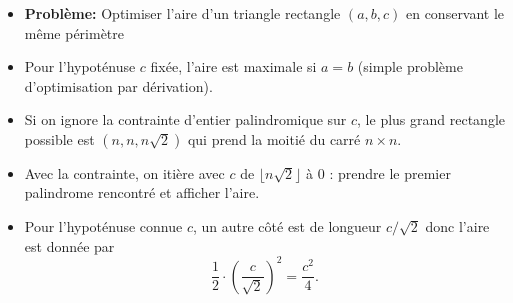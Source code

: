 \begin{frame}
    \frametitle{\problemtitle}
    \begin{itemize}
        \item<+-> \textbf{Problème:} Optimiser l'aire d'un triangle rectangle $(a,b,c)$ en conservant le même périmètre
        \item<+-> Pour l'hypoténuse $c$ fixée, l'aire est maximale si $a=b$ (simple problème d'optimisation par dérivation).
        \item<+-> Si on ignore la contrainte d'entier palindromique sur $c$, le plus grand rectangle possible est $(n,n,n\sqrt{2})$ qui prend la moitié du carré $n\times n$.
        \item<+-> Avec la contrainte, on itière avec $c$ de $\lfloor n\sqrt{2} \rfloor$ à $0$ : prendre le premier palindrome rencontré et afficher l'aire.
        \item<+-> Pour l'hypoténuse connue $c$, un autre côté est de longueur $c/\sqrt{2}$ donc l'aire est donnée par \[\frac{1}{2}\cdot\left(\frac{c}{\sqrt{2}}\right)^2 = \frac{c^2}{4}.\]

    \end{itemize}
\end{frame}
